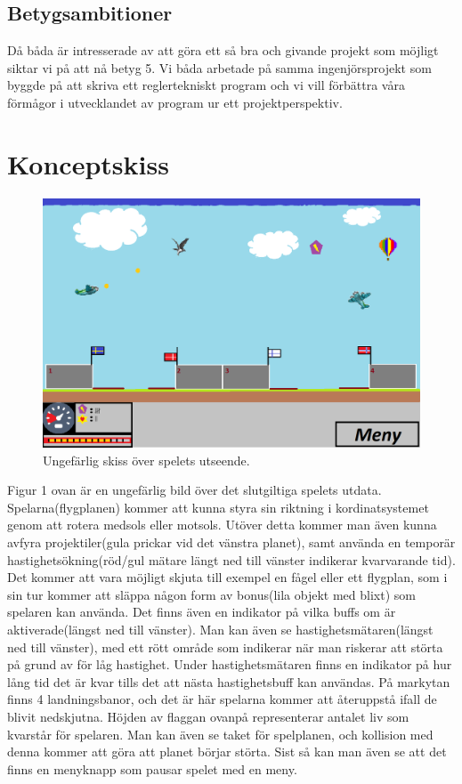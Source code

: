 \documentclass[12pt,a4paper]{article}
\begin{document}
\subsection{Betygsambitioner}
Då båda är intresserade av att göra ett så bra och givande projekt som möjligt siktar vi på att nå betyg 5. Vi båda arbetade på samma ingenjörsprojekt som byggde på att skriva ett reglertekniskt program och vi vill förbättra våra förmågor i utvecklandet av program ur ett projektperspektiv. 

\section{Konceptskiss}
\begin{figure}[H]
	\caption{Ungefärlig skiss över spelets utseende.}
	\centering
	\includegraphics[width=\linewidth]{Konceptskiss.png}
\end{figure}
Figur 1 ovan är en ungefärlig bild över det slutgiltiga spelets utdata. Spelarna(flygplanen) kommer att kunna styra sin riktning i kordinatsystemet genom att rotera medsols eller motsols. Utöver detta kommer man även kunna avfyra projektiler(gula prickar vid det vänstra planet), samt använda en temporär hastighetsökning(röd/gul mätare längt ned till vänster indikerar kvarvarande tid). Det kommer att vara möjligt skjuta till exempel en fågel eller ett flygplan, som i sin tur kommer att släppa någon form av bonus(lila objekt med blixt) som spelaren kan använda. Det finns även en indikator på vilka buffs om är aktiverade(längst ned till vänster). Man kan även se hastighetsmätaren(längst ned till vänster), med ett rött område som indikerar när man riskerar att störta på grund av för låg hastighet. Under hastighetsmätaren finns en indikator på hur lång tid det är kvar tills det att nästa hastighetsbuff kan användas.
På markytan finns 4 landningsbanor, och det är här spelarna kommer att återuppstå ifall de blivit nedskjutna. Höjden av flaggan ovanpå representerar antalet liv som kvarstår för spelaren. Man kan även se taket för spelplanen, och kollision med denna kommer att göra att planet börjar störta. Sist så kan man även se att det finns en menyknapp som pausar spelet med en meny. 
\vspace{0.4cm}
\end{document}
